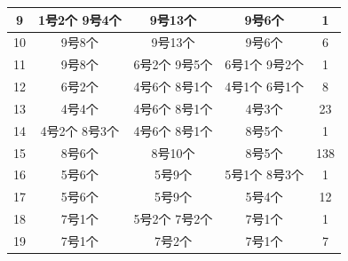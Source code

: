 \documentclass{article}
\begin{document}
\begin{table}[!h]
\begin{tabular}{|c|c|c|c|c|}
			9     & 1号2个 9号4个                                                       & 9号13个                                                           & 9号6个       & 1   \\ \hline
			10    & 9号8个                                                            & 9号13个                                                           & 9号6个       & 6   \\ \hline
			11    & 9号8个                                                            & 6号2个 9号5个                                                       & 6号1个 9号2个  & 1   \\ \hline
			12    & 6号2个                                                            & 4号6个 8号1个                                                       & 4号1个 6号1个  & 8   \\ \hline
			13    & 4号4个                                                            & 4号6个 8号1个                                                       & 4号3个       & 23  \\ \hline
			14    & 4号2个 8号3个                                                       & 4号6个 8号1个                                                       & 8号5个       & 1   \\ \hline
			15    & 8号6个                                                            & 8号10个                                                           & 8号5个       & 138 \\ \hline
			16    & 5号6个                                                            & 5号9个                                                            & 5号1个 8号3个  & 1   \\ \hline
			17    & 5号6个                                                            & 5号9个                                                            & 5号4个       & 12  \\ \hline
			18    & 7号1个                                                            & 5号2个 7号2个                                                       & 7号1个       & 1   \\ \hline
			19    & 7号1个                                                            & 7号2个                                                            & 7号1个       & 7   \\ \hline
		\end{tabular}
	\end{table}
	
\end{document}
